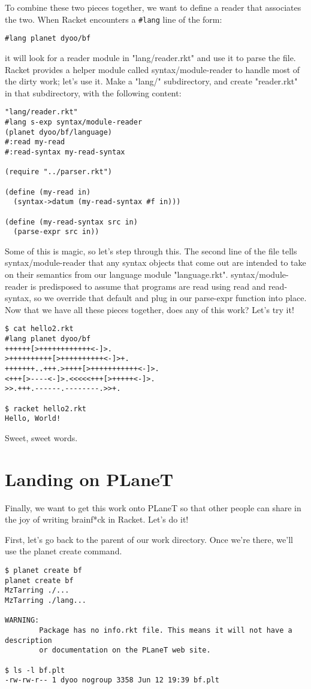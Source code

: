 \documentclass{article}
\begin{document}
To combine these two pieces together, we want to define a reader that associates the two. When Racket encounters a \verb+#lang+ line of the form:
\begin{verbatim}
#lang planet dyoo/bf
\end{verbatim}
it will look for a reader module in "lang/reader.rkt" and use it to parse the file.
Racket provides a helper module called syntax/module-reader to handle most of the dirty work; let's use it. Make a "lang/" subdirectory, and create "reader.rkt" in that subdirectory, with the following content:
\begin{verbatim}
"lang/reader.rkt"
#lang s-exp syntax/module-reader
(planet dyoo/bf/language)
#:read my-read
#:read-syntax my-read-syntax
 
(require "../parser.rkt")
 
(define (my-read in)
  (syntax->datum (my-read-syntax #f in)))
 
(define (my-read-syntax src in)
  (parse-expr src in))
\end{verbatim}
Some of this is magic, so let's step through this. The second line of the file tells syntax/module-reader that any syntax objects that come out are intended to take on their semantics from our language module "language.rkt". syntax/module-reader is predisposed to assume that programs are read using read and read-syntax, so we override that default and plug in our parse-expr function into place.
Now that we have all these pieces together, does any of this work? Let's try it!
\begin{verbatim}
$ cat hello2.rkt
#lang planet dyoo/bf
++++++[>++++++++++++<-]>.
>++++++++++[>++++++++++<-]>+.
+++++++..+++.>++++[>+++++++++++<-]>.
<+++[>----<-]>.<<<<<+++[>+++++<-]>.
>>.+++.------.--------.>>+.
 
$ racket hello2.rkt
Hello, World!
\end{verbatim}
Sweet, sweet words.

\section{Landing on PLaneT}
Finally, we want to get this work onto PLaneT so that other people can share in the joy of writing brainf*ck in Racket. Let's do it!

First, let's go back to the parent of our work directory. Once we're there, we'll use the planet create command.
\begin{verbatim}
$ planet create bf
planet create bf
MzTarring ./...
MzTarring ./lang...
 
WARNING:
        Package has no info.rkt file. This means it will not have a description
        or documentation on the PLaneT web site.
 
$ ls -l bf.plt
-rw-rw-r-- 1 dyoo nogroup 3358 Jun 12 19:39 bf.plt
\end{verbatim}
\end{document}
